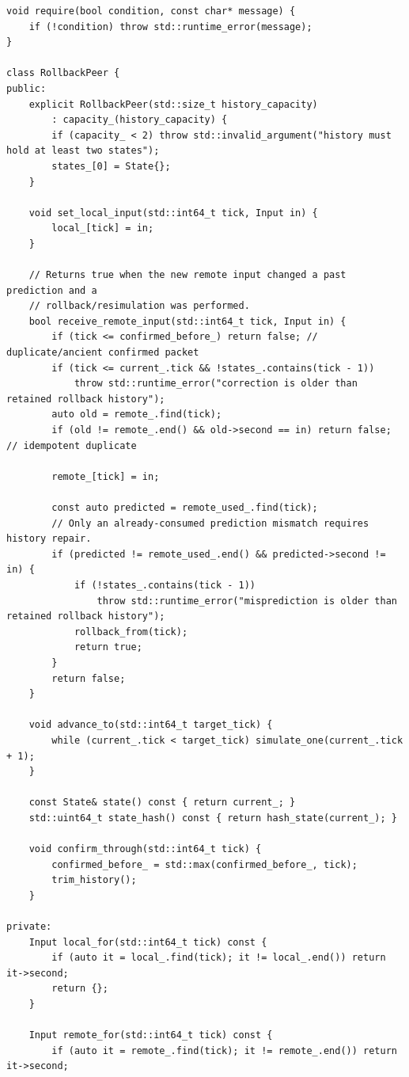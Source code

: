 \begin{verbatim}
void require(bool condition, const char* message) {
    if (!condition) throw std::runtime_error(message);
}

class RollbackPeer {
public:
    explicit RollbackPeer(std::size_t history_capacity)
        : capacity_(history_capacity) {
        if (capacity_ < 2) throw std::invalid_argument("history must hold at least two states");
        states_[0] = State{};
    }

    void set_local_input(std::int64_t tick, Input in) {
        local_[tick] = in;
    }

    // Returns true when the new remote input changed a past prediction and a
    // rollback/resimulation was performed.
    bool receive_remote_input(std::int64_t tick, Input in) {
        if (tick <= confirmed_before_) return false; // duplicate/ancient confirmed packet
        if (tick <= current_.tick && !states_.contains(tick - 1))
            throw std::runtime_error("correction is older than retained rollback history");
        auto old = remote_.find(tick);
        if (old != remote_.end() && old->second == in) return false; // idempotent duplicate

        remote_[tick] = in;

        const auto predicted = remote_used_.find(tick);
        // Only an already-consumed prediction mismatch requires history repair.
        if (predicted != remote_used_.end() && predicted->second != in) {
            if (!states_.contains(tick - 1))
                throw std::runtime_error("misprediction is older than retained rollback history");
            rollback_from(tick);
            return true;
        }
        return false;
    }

    void advance_to(std::int64_t target_tick) {
        while (current_.tick < target_tick) simulate_one(current_.tick + 1);
    }

    const State& state() const { return current_; }
    std::uint64_t state_hash() const { return hash_state(current_); }

    void confirm_through(std::int64_t tick) {
        confirmed_before_ = std::max(confirmed_before_, tick);
        trim_history();
    }

private:
    Input local_for(std::int64_t tick) const {
        if (auto it = local_.find(tick); it != local_.end()) return it->second;
        return {};
    }

    Input remote_for(std::int64_t tick) const {
        if (auto it = remote_.find(tick); it != remote_.end()) return it->second;


\end{verbatim}
